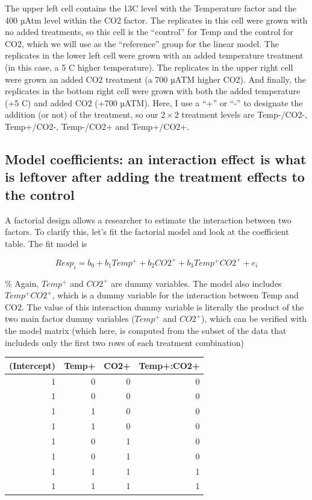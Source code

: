 \documentclass[]{book}
\theoremstyle{definition}
\theoremstyle{definition}
\theoremstyle{definition}
\theoremstyle{remark}
\begin{document}
The upper left cell contains the 13C level with the Temperature factor
and the 400 µAtm level within the CO2 factor. The replicates in this
cell were grown with no added treatments, so this cell is the
``control'' for Temp and the control for CO2, which we will use as the
``reference'' group for the linear model. The replicates in the lower
left cell were grown with an added temperature treatment (in this case,
a 5 C higher temperature). The replicates in the upper right cell were
grown an added CO2 treatment (a 700 µATM higher CO2). And finally, the
replicates in the bottom right cell were grown with both the added
temperature (+5 C) and added CO2 (+700 µATM). Here, I use a ``+'' or
``-'' to designate the addition (or not) of the treatment, so our
\(2 \times 2\) treatment levels are Temp-/CO2-, Temp+/CO2-, Temp-/CO2+
and Temp+/CO2+.

\subsection{Model coefficients: an interaction effect is what is
leftover after adding the treatment effects to the
control}\label{model-coefficients-an-interaction-effect-is-what-is-leftover-after-adding-the-treatment-effects-to-the-control}

A factorial design allows a researcher to estimate the interaction
between two factors. To clarify this, let's fit the factorial model and
look at the coefficient table. The fit model is

\begin{equation}
Resp_i = b_0 + b_1 Temp^+ + b_2 CO2^+ + b_3 Temp^+ CO2^+ + e_i
\end{equation}

\% Again, \(Temp^+\) and \(CO2^+\) are dummy variables. The model also
includes \(Temp^+ CO2^+\), which is a dummy variable for the interaction
between Temp and CO2. The value of this interaction dummy variable is
literally the product of the two main factor dummy variables (\(Temp^+\)
and \(CO2^+\)), which can be verified with the model matrix (which here,
is computed from the subset of the data that includeds only the first
two rows of each treatment combination)

\begin{tabular}{r|r|r|r}
\hline
(Intercept) & Temp+ & CO2+ & Temp+:CO2+\\
\hline
1 & 0 & 0 & 0\\
\hline
1 & 0 & 0 & 0\\
\hline
1 & 1 & 0 & 0\\
\hline
1 & 1 & 0 & 0\\
\hline
1 & 0 & 1 & 0\\
\hline
1 & 0 & 1 & 0\\
\hline
1 & 1 & 1 & 1\\
\hline
1 & 1 & 1 & 1\\
\hline
\end{tabular}
\end{document}

